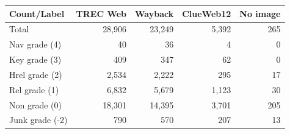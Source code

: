 \begin{table}[h]
  \label{tab:countsources}
  \begin{tabular}{ l | r | r  r  r }
  \toprule
    Count/Label & TREC Web & Wayback & ClueWeb12 & No image\\
    \midrule
    Total & 28,906 & 23,249 & 5,392 & 265 \\
    Nav grade (4) & 40 & 36 & 4 & 0\\
    Key grade (3) & 409 & 347 & 62 & 0\\
    Hrel grade (2) & 2,534 & 2,222 & 295 & 17 \\
    Rel grade (1) & 6,832 & 5,679 & 1,123 & 30\\
    Non grade (0) & 18,301 & 14,395 & 3,701 & 205 \\
    Junk grade (-2) & 790 & 570 & 207 & 13\\
    \bottomrule
  \end{tabular} 
\end{table}


